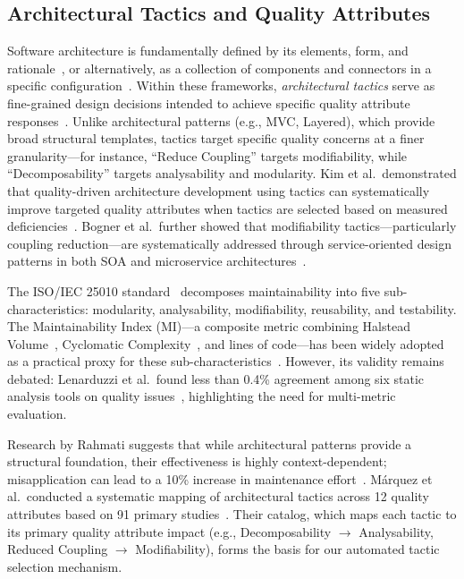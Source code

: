 \documentclass[sigconf,review,anonymous]{acmart}
\begin{document}
\subsection{Architectural Tactics and Quality Attributes}
Software architecture is fundamentally defined by its elements, form, and rationale~\cite{perry1992foundations}, or alternatively, as a collection of components and connectors in a specific configuration~\cite{garlan1993introduction}. Within these frameworks, \textit{architectural tactics} serve as fine-grained design decisions intended to achieve specific quality attribute responses~\cite{bass2021software}. Unlike architectural patterns (e.g., MVC, Layered), which provide broad structural templates, tactics target specific quality concerns at a finer granularity---for instance, ``Reduce Coupling'' targets modifiability, while ``Decomposability'' targets analysability and modularity. Kim et al.\ demonstrated that quality-driven architecture development using tactics can systematically improve targeted quality attributes when tactics are selected based on measured deficiencies~\cite{kim2009qualitydriven}. Bogner et al.\ further showed that modifiability tactics---particularly coupling reduction---are systematically addressed through service-oriented design patterns in both SOA and microservice architectures~\cite{bogner2019modifiability}.

The ISO/IEC 25010 standard~\cite{ISO25010} decomposes maintainability into five sub-characteristics: modularity, analysability, modifiability, reusability, and testability. The Maintainability Index (MI)---a composite metric combining Halstead Volume~\cite{halstead1977elements}, Cyclomatic Complexity~\cite{mccabe1976complexity}, and lines of code---has been widely adopted as a practical proxy for these sub-characteristics~\cite{oman1992maintainability}. However, its validity remains debated: Lenarduzzi et al.\ found less than 0.4\% agreement among six static analysis tools on quality issues~\cite{lenarduzzi2023critical}, highlighting the need for multi-metric evaluation.

Research by Rahmati suggests that while architectural patterns provide a structural foundation, their effectiveness is highly context-dependent; misapplication can lead to a 10\% increase in maintenance effort~\cite{rahmati2021ensuring}. M\'arquez et al.\ conducted a systematic mapping of architectural tactics across 12 quality attributes based on 91 primary studies~\cite{marquez2022architectural}. Their catalog, which maps each tactic to its primary quality attribute impact (e.g., Decomposability $\rightarrow$ Analysability, Reduced Coupling $\rightarrow$ Modifiability), forms the basis for our automated tactic selection mechanism.
\end{document}
